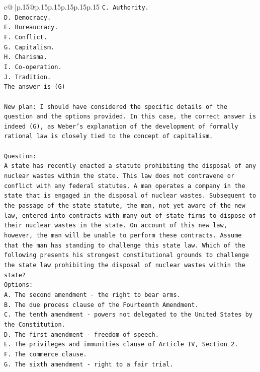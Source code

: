 \documentclass{article}
\begin{document}
{\begin{supertabular}{c@{$\;$}|p{.15\linewidth}@{}p{.15\linewidth}p{.15\linewidth}p{.15\linewidth}p{.15\linewidth}p{.15\linewidth}}
{{{\texttt{C. Authority.} \\
\texttt{D. Democracy.} \\
\texttt{E. Bureaucracy.} \\
\texttt{F. Conflict.} \\
\texttt{G. Capitalism.} \\
\texttt{H. Charisma.} \\
\texttt{I. Co{-}operation.} \\
\texttt{J. Tradition.} \\
\texttt{The answer is (G)} \\
\\ 
\texttt{New plan: I should have considered the specific details of the question and the options provided. In this case, the correct answer is indeed (G), as Weber's explanation of the development of formally rational law is closely tied to the concept of capitalism.} \\
\\ 
\texttt{Question:} \\
\texttt{A state has recently enacted a statute prohibiting the disposal of any nuclear wastes within the state. This law does not contravene or conflict with any federal statutes. A man operates a company in the state that is engaged in the disposal of nuclear wastes. Subsequent to the passage of the state statute, the man, not yet aware of the new law, entered into contracts with many out{-}of{-}state firms to dispose of their nuclear wastes in the state. On account of this new law, however, the man will be unable to perform these contracts. Assume that the man has standing to challenge this state law. Which of the following presents his strongest constitutional grounds to challenge the state law prohibiting the disposal of nuclear wastes within the state?} \\
\texttt{Options:} \\
\texttt{A. The second amendment {-} the right to bear arms.} \\
\texttt{B. The due process clause of the Fourteenth Amendment.} \\
\texttt{C. The tenth amendment {-} powers not delegated to the United States by the Constitution.} \\
\texttt{D. The first amendment {-} freedom of speech.} \\
\texttt{E. The privileges and immunities clause of Article IV, Section 2.} \\
\texttt{F. The commerce clause.} \\
\texttt{G. The sixth amendment {-} right to a fair trial.} \\
}}}
\end{supertabular}}
\end{document}
